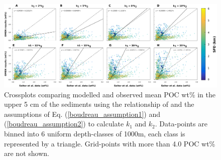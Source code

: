 \documentclass[gmd, manuscript]{copernicus}
\begin{document}


\begin{figure}[tbp]
\begin{center}
	\includegraphics[width=1.0\textwidth]{figures/OMEN-GENIE-Exp/0_Boudreau_CROSSPLOTS_290817_noDEPTHDEP_BigTriangles_120118_NoR2.pdf}
	\caption{Crossplots comparing modelled and observed mean POC wt\% in the upper 5 cm of the sediments using the relationship of \citet{boudreau1997diagenetic} and the assumptions of Eq. (\ref{boudreau_assumption1}) and 
	(\ref{boudreau_assumption2}) to calculate $k_1$ and $k_2$.  Data-points are binned into 6 uniform depth-classes of 1000m, each class is represented by a triangle. 
	Grid-points with more than 4.0 POC wt\% are not shown.}
	\label{fig:OMEN_GENIE_Boudreau_results}
\end{center}
\end{figure}
\end{document}
